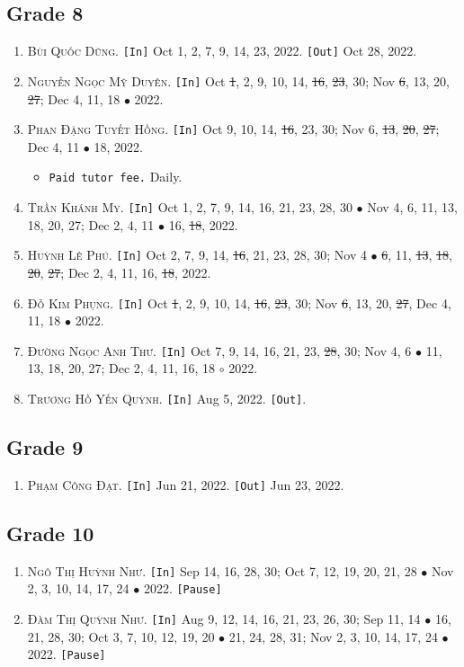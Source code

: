 \documentclass{article}
\numberwithin{equation}{section}
\begin{document}
\subsection{Grade 8}
\begin{enumerate}
	\item \textsc{Bùi Quốc Dũng.} \texttt{[In]} Oct 1, 2, 7, 9, 14, 23, 2022. \texttt{[Out]} Oct 28, 2022.
	\item \textsc{Nguyễn Ngọc Mỹ Duyên.} \texttt{[In]} Oct \st{1}, 2, 9, 10, 14, \st{16}, \st{23}, 30; Nov \st{6}, 13, 20, \st{27}; Dec 4, 11, 18 $\bullet$ 2022.
	\item \textsc{Phan Đặng Tuyết Hồng.} \texttt{[In]} Oct 9, 10, 14, \st{16}, 23, 30; Nov 6, \st{13}, \st{20}, \st{27}; Dec 4, 11 $\bullet$ 18, 2022.
	\begin{itemize}
		\item \texttt{Paid tutor fee.} Daily.
	\end{itemize}
	\item \textsc{Trần Khánh My.} \texttt{[In]} Oct 1, 2, 7, 9, 14, 16, 21, 23, 28, 30 $\bullet$ Nov 4, 6, 11, 13, 18, 20, 27; Dec 2, 4, 11 $\bullet$ 16, \st{18}, 2022.
	\item \textsc{Huỳnh Lê Phú.} \texttt{[In]} Oct 2, 7, 9, 14, \st{16}, 21, 23, 28, 30; Nov 4 $\bullet$ \st{6}, 11, \st{13}, \st{18}, \st{20}, \st{27}; Dec 2, 4, 11, 16, \st{18}, 2022.
	\item \textsc{Đỗ Kim Phụng.} \texttt{[In]} Oct \st{1}, 2, 9, 10, 14, \st{16}, \st{23}, 30; Nov \st{6}, 13, 20, \st{27}, Dec 4, 11, 18 $\bullet$ 2022.
	\item \textsc{Đường Ngọc Anh Thư.} \texttt{[In]} Oct 7, 9, 14, 16, 21, 23, \st{28}, 30; Nov 4, 6 $\bullet$ 11, 13, 18, 20, 27; Dec 2, 4, 11, 16, 18 $\circ$ 2022.
	\item \textsc{Trương Hồ Yến Quỳnh.} \texttt{[In]} Aug 5, 2022. \texttt{[Out]}.
\end{enumerate}

\subsection{Grade 9}
\begin{enumerate}
	\item \textsc{Phạm Công Đạt.} \texttt{[In]} Jun 21, 2022. \texttt{[Out]} Jun 23, 2022.
\end{enumerate}

\subsection{Grade 10}
\begin{enumerate}
	\item \textsc{Ngô Thị Huỳnh Như.} \texttt{[In]} Sep 14, 16, 28, 30; Oct 7, 12, 19, 20, 21, 28 $\bullet$ Nov 2, 3, 10, 14, 17, 24 $\bullet$ 2022. \texttt{[Pause]}
	\item \textsc{Đàm Thị Quỳnh Như.} \texttt{[In]} Aug 9, 12, 14, 16, 21, 23, 26, 30; Sep 11, 14 $\bullet$ 16, 21, 28, 30; Oct 3, 7, 10, 12, 19, 20 $\bullet$ 21, 24, 28, 31; Nov 2, 3, 10, 14, 17, 24 $\bullet$ 2022. \texttt{[Pause]}
\end{enumerate}
\end{document}

